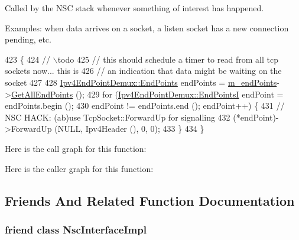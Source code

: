 Called by the N\+SC stack whenever something of interest has happened. 

Examples\+: when data arrives on a socket, a listen socket has a new connection pending, etc. 
\begin{DoxyCode}
423 \{
424   \textcolor{comment}{// \(\backslash\)todo}
425   \textcolor{comment}{// this should schedule a timer to read from all tcp sockets now... this is}
426   \textcolor{comment}{// an indication that data might be waiting on the socket}
427 
428   \hyperlink{classns3_1_1Ipv4EndPointDemux_a506a9661c08e2a64dab09ad6613d3b45}{Ipv4EndPointDemux::EndPoints} endPoints = 
      \hyperlink{classns3_1_1NscTcpL4Protocol_a5cc20dcc5c7877b042c1179f11af6a90}{m\_endPoints}->\hyperlink{classns3_1_1Ipv4EndPointDemux_a47fe377300406d38259f176179b71cd6}{GetAllEndPoints} ();
429   \textcolor{keywordflow}{for} (\hyperlink{classns3_1_1Ipv4EndPointDemux_ad3ce6fd3c128dcb46d10d562c82b4e07}{Ipv4EndPointDemux::EndPointsI} endPoint = endPoints.begin ();
430        endPoint != endPoints.end (); endPoint++) \{
431       \textcolor{comment}{// NSC HACK: (ab)use TcpSocket::ForwardUp for signalling}
432       (*endPoint)->ForwardUp (NULL, Ipv4Header (), 0, 0);
433     \}
434 \}
\end{DoxyCode}


Here is the call graph for this function\+:




Here is the caller graph for this function\+:




\subsection{Friends And Related Function Documentation}
\subsubsection[{\texorpdfstring{Nsc\+Interface\+Impl}{NscInterfaceImpl}}]{\setlength{\rightskip}{0pt plus 5cm}friend class {\bf Nsc\+Interface\+Impl}\hspace{0.3cm}{\ttfamily [friend]}}\hypertarget{classns3_1_1NscTcpL4Protocol_a083f791782454a6f8f1d126804d70de6}{}\label{classns3_1_1NscTcpL4Protocol_a083f791782454a6f8f1d126804d70de6}


